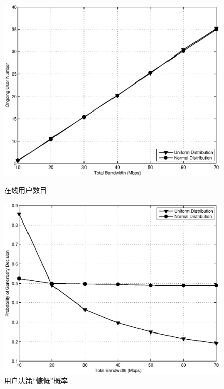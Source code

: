 \begin{figure}[!tb] 
    \centering
   \begin{minipage}[t]{0.65\linewidth} 
    \centering 
    \includegraphics[width = \textwidth]{bayesian_normal_bandwidth_vs_user_number} 
    \caption{在线用户数目} 
    \label{fig:chap_bayesian:normal_bandwidth_vs_user_number} 
  \end{minipage}%

  \begin{minipage}[t]{0.65\linewidth} 
    \centering 
    \includegraphics[width = \textwidth]{bayesian_normal_bandwidth_vs_generosity} 
    \caption{用户决策“慷慨”概率} 
    \label{fig:chap_bayesian:normal_bandwidth_vs_generosity} 
  \end{minipage}%
\end{figure}

